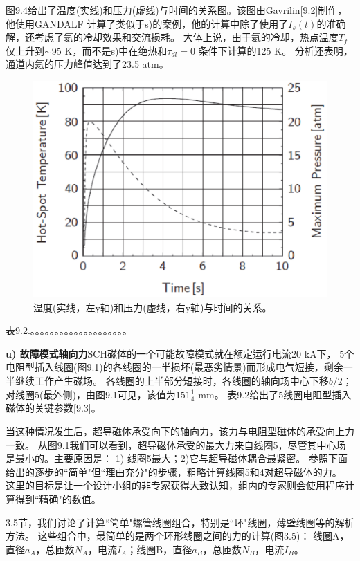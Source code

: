 图9.4给出了温度(实线)和压力(虚线)与时间的关系图。该图由Gavrilin[9.2]制作，他使用GANDALF
计算了类似于s)的案例，他的计算中除了使用了$I_s(t)$的准确解，还考虑了氦的冷却效果和交流损耗。
大体上说，由于氦的冷却，热点温度$T_f$仅上升到$\sim$95 K，而不是s)中在绝热和$\tau_{dl}=0$
条件下计算的125 K。
分析还表明，通道内氦的压力峰值达到了23.5 atm。
\begin{figure}[htbp]
	\centering
	\includegraphics[scale=0.6]{chpt9/figs/fig9.4.eps}
	\caption{温度(实线，左y轴)和压力(虚线，右y轴)与时间的关系。}
\end{figure}

表9.2.。。。。。。。。。。。。。。。。。。。。


\textbf{u) 故障模式轴向力}\qquad SCH磁体的一个可能故障模式就在额定运行电流20 kA下，
5个电阻型插入线圈(图9.1)的各线圈的一半损坏(最恶劣情景)而形成电气短接，剩余一半继续工作产生磁场。
各线圈的上半部分短接时，各线圈的轴向场中心下移$b/2$；
对线圈5(最外侧)，由图9.1可见，该值为$151\frac{1}{4}$ mm。
表9.2给出了5线圈电阻型插入磁体的关键参数[9.3]。

当这种情况发生后，超导磁体承受向下的轴向力，该力与电阻型磁体的承受向上力一致。
从图9.1我们可以看到，超导磁体承受的最大力来自线圈5，尽管其中心场是最小的。主要原因是：
1) 线圈5最大；2)它与超导磁体耦合最紧密。
参照下面给出的逐步的``简单"但``理由充分"的步骤，粗略计算线圈5和4对超导磁体的力。
这里的目标是让一个设计小组的非专家获得大致认知，组内的专家则会使用程序计算得到``精确"的数值。

3.5节，我们讨论了计算``简单"螺管线圈组合，特别是``环"线圈，薄壁线圈等的解析方法。
这些组合中，最简单的是两个环形线圈之间的力的计算(图3.5)：
线圈A，直径$a_A$，总匝数$N_A$，电流$I_A$；线圈B，直径$a_B$，总匝数$N_B$，电流$I_B$。

